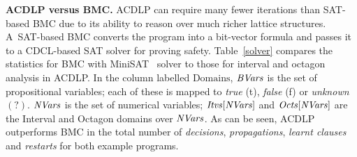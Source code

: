 \medskip

\noindent \textbf{ACDLP versus BMC.}
ACDLP can require many fewer iterations than SAT-based BMC due to its
ability to reason over much richer lattice structures.
A~SAT-based BMC converts the program into a bit-vector formula 
and passes it to a CDCL-based SAT solver for proving safety.  
Table~\ref{solver} compares the statistics for BMC with 
MiniSAT~\cite{minisat} solver to those for interval and octagon 
analysis in ACDLP. In the column labelled $\textrm{Domains}$, 
$\mathit{BVars}$ is the set of propositional variables; each of these is mapped to
{\em true} (t), {\em false} (f) or {\em unknown} $(?)$. $\mathit{NVars}$ is the set of
numerical variables;
$\mathit{Itvs}[\mathit{NVars}]$ and $\mathit{Octs}[\mathit{NVars}]$ are the Interval and Octagon
domains over $\mathit{NVars}$. As can be seen, ACDLP outperforms BMC in the total number of 
{\em decisions}, {\em propagations}, {\em learnt clauses} and {\em restarts} 
for both example programs.

